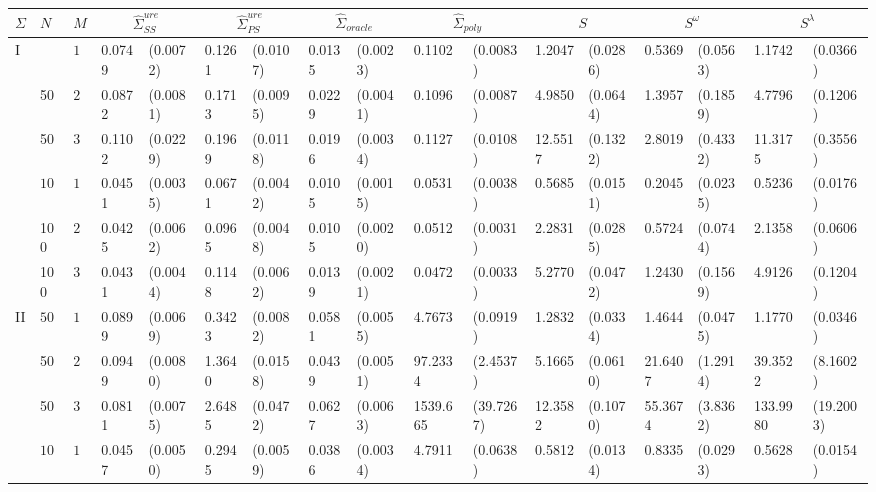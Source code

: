 \begin{table}[H]
\centering
\begin{footnotesize}
\begin{tabular}{lllllllllllllllll}
$\Sigma$ & $N$ & $M$ & \multicolumn{2}{c}{$\hat{\Sigma}^{ure}_{SS}$} &  \multicolumn{2}{c}{$\hat{\Sigma}^{ure}_{PS}$} &  \multicolumn{2}{c}{$\hat{\Sigma}_{oracle}$}   &  \multicolumn{2}{c}{$\hat{\Sigma}_{poly}$}  &  \multicolumn{2}{c}{$S$}   &  \multicolumn{2}{c}{$S^\omega$}   &  \multicolumn{2}{c}{$S^\lambda$}   \\ 
  \hline
I &  & $10$ & 0.0749 & (0.0072) & 0.1261 & (0.0107) & 0.0135 & (0.0023) & 0.1102 & (0.0083) & 1.2047 & (0.0286) & 0.5369 & (0.0563) & 1.1742 & (0.0366) \\ 
    & 50  & $20$ & 0.0872 & (0.0081) & 0.1713 & (0.0095) & 0.0229 & (0.0041) & 0.1096 & (0.0087) & 4.9850 & (0.0644) & 1.3957 & (0.1859) & 4.7796 & (0.1206) \\ 
    &  50 & $30$ & 0.1102 & (0.0229) & 0.1969 & (0.0118) & 0.0196 & (0.0034) & 0.1127 & (0.0108) & 12.5517 & (0.1322) & 2.8019 & (0.4332) & 11.3175 & (0.3556) \\ 
    & $100$ & $10$ & 0.0451 & (0.0035) & 0.0671 & (0.0042) & 0.0105 & (0.0015) & 0.0531 & (0.0038) & 0.5685 & (0.0151) & 0.2045 & (0.0235) & 0.5236 & (0.0176) \\ 
    &  100 & $20$ & 0.0425 & (0.0062) & 0.0965 & (0.0048) & 0.0105 & (0.0020) & 0.0512 & (0.0031) & 2.2831 & (0.0285) & 0.5724 & (0.0744) & 2.1358 & (0.0606) \\ 
    & 100  & $30$ & 0.0431 & (0.0044) & 0.1148 & (0.0062) & 0.0139 & (0.0021) & 0.0472 & (0.0033) & 5.2770 & (0.0472) & 1.2430 & (0.1569) & 4.9126 & (0.1204) \\ 
  II & $50$ & $10$ & 0.0899 & (0.0069) & 0.3423 & (0.0082) & 0.0581 & (0.0055) & 4.7673 & (0.0919) & 1.2832 & (0.0334) & 1.4644 & (0.0475) & 1.1770 & (0.0346) \\ 
    &  50 & $20$ & 0.0949 & (0.0080) & 1.3640 & (0.0158) & 0.0439 & (0.0051) & 97.2334 & (2.4537) & 5.1665 & (0.0610) & 21.6407 & (1.2914) & 39.3522 & (8.1602) \\ 
    &  50 & $30$ & 0.0811 & (0.0075) & 2.6485 & (0.0472) & 0.0627 & (0.0063) & 1539.665 & (39.7267) & 12.3582 & (0.1070) & 55.3674 & (3.8362) & 133.9980 & (19.2003) \\ 
    & $100$ & $10$ & 0.0457 & (0.0050) & 0.2945 & (0.0059) & 0.0386 & (0.0034) & 4.7911 & (0.0638) & 0.5812 & (0.0134) & 0.8335 & (0.0293) & 0.5628 & (0.0154) \\ 

\end{tabular}
\end{footnotesize}
\end{table}
